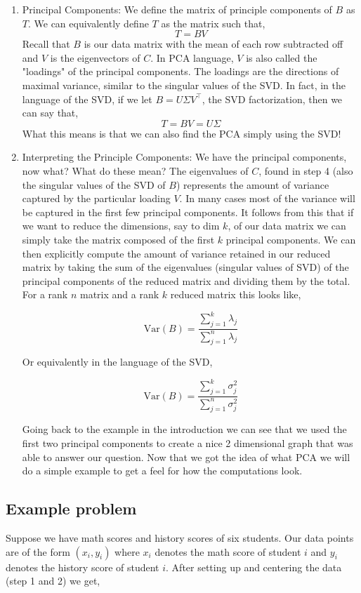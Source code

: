 \documentclass{article}
\begin{document}
\begin{enumerate}
\item Principal Components: We define the matrix of principle components of $B$ as $T$. We can equivalently define $T$ as the matrix such that,
$$T=BV$$
Recall that $B$ is our data matrix with the mean of each row subtracted off and $V$ is the eigenvectors of $C$. In PCA language, $V$ is also called the "loadings" of the principal components. The loadings are the directions of maximal variance, similar to the singular values of the SVD. In fact, in the language of the SVD, if we let $B=U\Sigma V^\top$, the SVD factorization, then we can say that,
$$T=BV=U\Sigma$$
What this means is that we can also find the PCA simply using the SVD!

\item Interpreting the Principle Components: We have the principal components, now what? What do these mean? The eigenvalues of $C$, found in step 4 (also the singular values of the SVD of $B$) represents the amount of variance captured by the particular loading $V$. In many cases most of the variance will be captured in the first few principal components. It follows from this that if we want to reduce the dimensions, say to dim $k$, of our data matrix we can simply take the matrix composed of the first $k$ principal components. We can then explicitly compute the amount of variance retained in our reduced matrix by taking the sum of the eigenvalues (singular values of SVD) of the principal components of the reduced matrix and dividing them by the total. For a rank $n$ matrix and a rank $k$ reduced matrix this looks like,

$$\text{Var}(B)=\frac{\sum_{j=1}^{k}\lambda_j}{\sum_{j=1}^{n}\lambda_j}$$

Or equivalently in the language of the SVD,

$$\text{Var}(B)=\frac{\sum_{j=1}^{k}\sigma^2_j}{\sum_{j=1}^{n}\sigma^2_j}$$


Going back to the example in the introduction we can see that we used the first two principal components to create a nice 2 dimensional graph that was able to answer our question. Now that we got the idea of what PCA we will do a simple example to get a feel for how the computations look.
\end{enumerate}

\subsection{Example problem}
Suppose we have math scores and history scores of six students. Our data points are of the form $(x_i,y_i)$ where $x_i$ denotes the math score of student $i$ and $y_i$ denotes the
history score of student $i$. After setting up and centering the data (step 1 and 2) we get,
\end{document}
